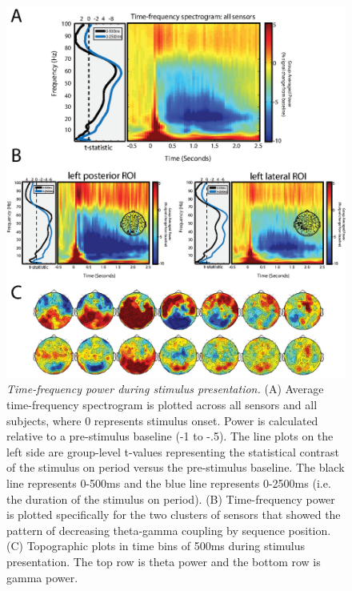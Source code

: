 \begin{figure}
  \centering
  \includegraphics[width=.75\textwidth]{figures/chapter3_suppfigure1.eps}
  \caption[Time-frequency power during stimulus presentation]{\textit{Time-frequency power during stimulus presentation.} (A) Average time-frequency spectrogram is plotted across all sensors and all subjects, where 0 represents stimulus onset.  Power is calculated relative to a pre-stimulus baseline (-1 to -.5).  The line plots on the left side are group-level t-values representing the statistical contrast of the stimulus on period versus the pre-stimulus baseline. The black line represents 0-500ms and the blue line represents 0-2500ms (i.e. the duration of the stimulus on period). (B) Time-frequency power is plotted specifically for the two clusters of sensors that showed the pattern of decreasing theta-gamma coupling by sequence position.  (C) Topographic plots in time bins of 500ms during stimulus presentation.  The top row is theta power and the bottom row is gamma power. }
  \label{chapter3_suppfigure1}
\end{figure}

